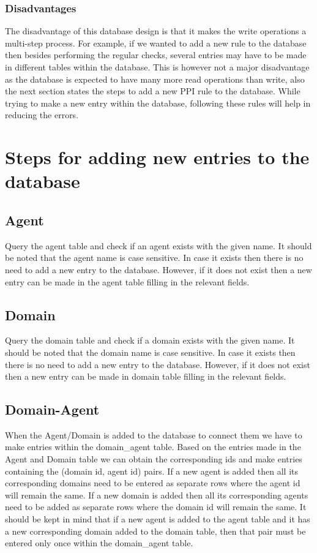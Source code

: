 \documentclass[msc,deptreport,ai]{infthesis}      %
\begin{document}
 \subsubsection{Disadvantages}
 The disadvantage of this database design is that it makes the write operations a multi-step process. For example, if we wanted to add a new rule to the database then besides performing the regular checks, several entries may have to be made in different tables within the database. This is however not a major disadvantage as the database is expected to have many more read operations than write, also the next section states the steps to add a new PPI rule to the database. While trying to make a new entry within the database, following these rules will help in reducing the errors.
\section{Steps for adding new entries to the database}
\subsection{Agent}
	Query the agent table and check if an agent exists with the given name. It should be noted that the agent name is case sensitive. In case it exists then there is no need to add a new entry to the database. However, if it does not exist then a new entry can be made in the agent table filling in the relevant fields. 
\subsection{Domain}
	Query the domain table and check if a domain exists with the given name. It should be noted that the domain name is case sensitive. In case it exists then there is no need to add a new entry to the database. However, if it does not exist then a new entry can be made in domain table filling in the relevant fields. 
\subsection{Domain-Agent}
	When the Agent/Domain is added to the database to connect them we have to make entries within the domain\_agent table. Based on the entries made in the Agent and Domain table we can obtain the corresponding ids and make entries containing the (domain id, agent id) pairs. If a new agent is added then all its corresponding domains need to be entered as separate rows where the agent id will remain the same. If a new domain is added then all its corresponding agents need to be added as separate rows where the domain id will remain the same. 	
	It should be kept in mind that if a new agent is added to the agent table and it has a new corresponding domain added to the domain table, then that pair must be entered only once within the domain\_agent table.	
\end{document}
